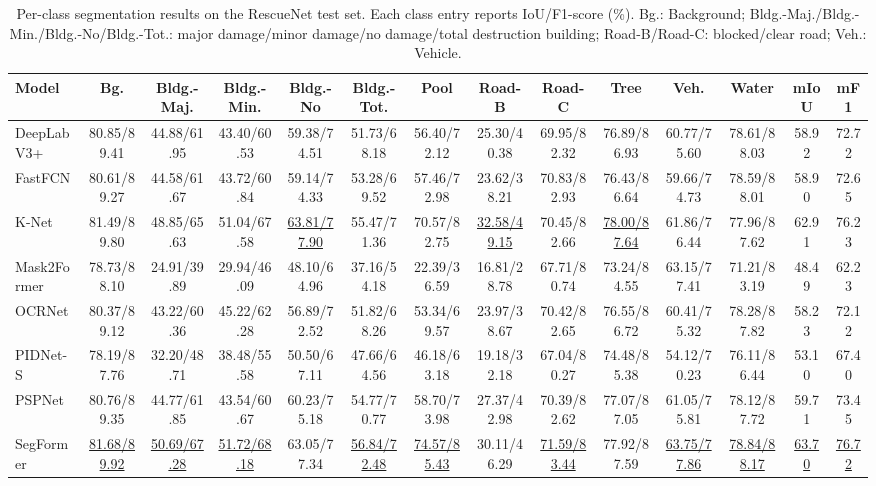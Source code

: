 \documentclass[lettersize,journal]{IEEEtran}
\begin{document}
\begin{table}[!t]
\caption{Per-class segmentation results on the RescueNet test set. Each class entry reports IoU/F1-score (\%). Bg.: Background; Bldg.-Maj./Bldg.-Min./Bldg.-No/Bldg.-Tot.: major damage/minor damage/no damage/total destruction building; Road-B/Road-C: blocked/clear road; Veh.: Vehicle.}
\label{tab:rescuenet-per-class-results}
\centering
\scriptsize
\setlength{\tabcolsep}{2pt}
\renewcommand{\arraystretch}{1.12}
\begin{tabular}{lccccccccccccc}
\hline
Model & Bg. & Bldg.-Maj. & Bldg.-Min. & Bldg.-No & Bldg.-Tot. & Pool & Road-B & Road-C & Tree & Veh. & Water & mIoU & mF1 \\
\hline
DeepLabV3+\cite{chenRethinkingAtrousConvolution2017} &80.85/89.41 & 44.88/61.95 & 43.40/60.53 & 59.38/74.51 & 51.73/68.18 & 56.40/72.12 & 25.30/40.38 & 69.95/82.32 & 76.89/86.93 & 60.77/75.60 & 78.61/88.03 & 58.92 & 72.72 \\
FastFCN\cite{wu2019fastfcn} &80.61/89.27 & 44.58/61.67 & 43.72/60.84 & 59.14/74.33 & 53.28/69.52 & 57.46/72.98 & 23.62/38.21 & 70.83/82.93 & 76.43/86.64 & 59.66/74.73 & 78.59/88.01 & 58.90 & 72.65 \\
K-Net\cite{zhang2021knet} &81.49/89.80 & 48.85/65.63 & 51.04/67.58 & \underline{63.81/77.90} & 55.47/71.36 & 70.57/82.75 & \underline{32.58/49.15} & 70.45/82.66 & \underline{78.00/87.64} & 61.86/76.44 & 77.96/87.62 & 62.91 & 76.23 \\
Mask2Former\cite{NEURIPS2021_950a4152} &78.73/88.10 & 24.91/39.89 & 29.94/46.09 & 48.10/64.96 & 37.16/54.18 & 22.39/36.59 & 16.81/28.78 & 67.71/80.74 & 73.24/84.55 & 63.15/77.41 & 71.21/83.19 & 48.49 & 62.23 \\
OCRNet\cite{YuanCW20} &80.37/89.12 & 43.22/60.36 & 45.22/62.28 & 56.89/72.52 & 51.82/68.26 & 53.34/69.57 & 23.97/38.67 & 70.42/82.65 & 76.55/86.72 & 60.41/75.32 & 78.28/87.82 & 58.23 & 72.12 \\
PIDNet-S\cite{xu2022pidnet} &78.19/87.76 & 32.20/48.71 & 38.48/55.58 & 50.50/67.11 & 47.66/64.56 & 46.18/63.18 & 19.18/32.18 & 67.04/80.27 & 74.48/85.38 & 54.12/70.23 & 76.11/86.44 & 53.10 & 67.40 \\
PSPNet\cite{zhaoPyramidSceneParsing2017a} &80.76/89.35 & 44.77/61.85 & 43.54/60.67 & 60.23/75.18 & 54.77/70.77 & 58.70/73.98 & 27.37/42.98 & 70.39/82.62 & 77.07/87.05 & 61.05/75.81 & 78.12/87.72 & 59.71 & 73.45 \\
SegFormer\cite{xie2021segformer} &\underline{81.68/89.92} & \underline{50.69/67.28} & \underline{51.72/68.18} & 63.05/77.34 & \underline{56.84/72.48} & \underline{74.57/85.43} & 30.11/46.29 & \underline{71.59/83.44} & 77.92/87.59 & \underline{63.75/77.86} & \underline{78.84/88.17} & \underline{63.70} & \underline{76.72} \\

\end{tabular}
\end{table}
\end{document}
